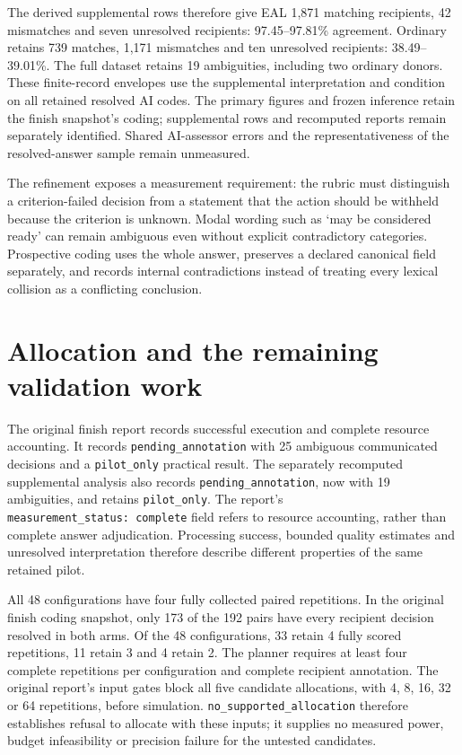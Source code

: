 \documentclass[preprint,11pt]{elsarticle}
\begin{document}
The derived supplemental rows therefore give EAL 1,871 matching
recipients, 42 mismatches and seven unresolved recipients:
97.45--97.81\% agreement. Ordinary retains 739 matches, 1,171 mismatches
and ten unresolved recipients: 38.49--39.01\%. The full dataset retains
19 ambiguities, including two ordinary donors. These finite-record
envelopes use the supplemental interpretation and condition on all
retained resolved AI codes. The primary figures and frozen inference
retain the finish snapshot's coding; supplemental rows and recomputed
reports remain separately identified. Shared AI-assessor errors and the
representativeness of the resolved-answer sample remain unmeasured.

The refinement exposes a measurement requirement: the rubric must
distinguish a criterion-failed decision from a statement that the action
should be withheld because the criterion is unknown. Modal wording such
as `may be considered ready' can remain ambiguous even without explicit
contradictory categories. Prospective coding uses the whole answer,
preserves a declared canonical field separately, and records internal
contradictions instead of treating every lexical collision as a
conflicting conclusion.

\FloatBarrier

\hypertarget{allocation-and-the-remaining-validation-work}{%
\section{Allocation and the remaining validation
work}\label{allocation-and-the-remaining-validation-work}}

The original finish report records successful execution and complete
resource accounting. It records \texttt{pending\_annotation} with 25
ambiguous communicated decisions and a \texttt{pilot\_only} practical
result. The separately recomputed supplemental analysis also records
\texttt{pending\_annotation}, now with 19 ambiguities, and retains
\texttt{pilot\_only}. The report's
\texttt{measurement\_status:\ complete} field refers to resource
accounting, rather than complete answer adjudication. Processing
success, bounded quality estimates and unresolved interpretation
therefore describe different properties of the same retained pilot.

All 48 configurations have four fully collected paired repetitions. In
the original finish coding snapshot, only 173 of the 192 pairs have
every recipient decision resolved in both arms. Of the 48
configurations, 33 retain 4 fully scored repetitions, 11 retain 3 and 4
retain 2. The planner requires at least four complete repetitions per
configuration and complete recipient annotation. The original report's
input gates block all five candidate allocations, with 4, 8, 16, 32 or
64 repetitions, before simulation. \texttt{no\_supported\_allocation}
therefore establishes refusal to allocate with these inputs; it supplies
no measured power, budget infeasibility or precision failure for the
untested candidates.
\end{document}
